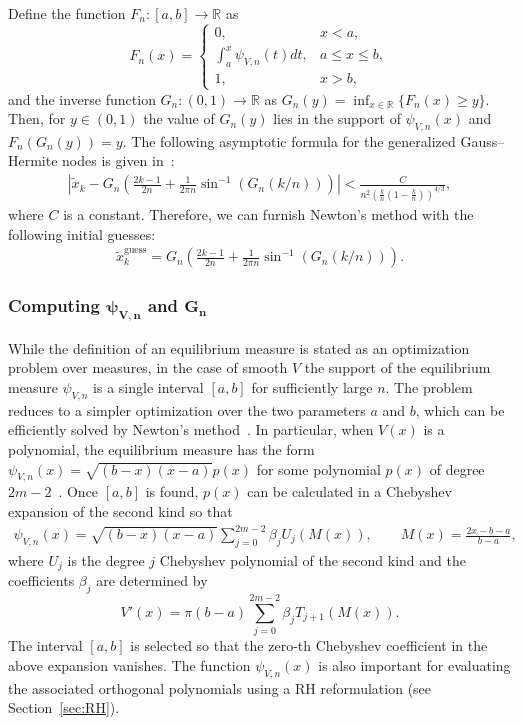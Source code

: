 \documentclass[final]{siamltex}
\begin{document}
Define the function $F_n:[a,b]\rightarrow \mathbb{R}$ as 
\[
F_n(x) = \begin{cases} 0, &  x<a,\\
\int_{a}^x \psi_{V,n}(t) dt, & a\leq x \leq b,\\
1, & x > b,\end{cases}
\]
and the inverse function $G_n:(0,1)\rightarrow \mathbb{R}$ as $G_n(y) =  \inf_{x \in \mathbb R}\{F_n(x) \geq y\} $. Then, for $y \in (0,1)$ the value of $G_n(y)$ lies in the support of $\psi_{V,n}(x)$ and $F_n(G_n(y)) = y$.  The following asymptotic formula for the generalized Gauss--Hermite nodes is given in~\cite{DKMVZ}:
\begin{align*}
\left|\tilde x_{k} - G_n\left( \frac{2k-1}{2n} + \frac{1}{2 \pi n}\sin^{-1}\left(G_n(k/n)\right) \right) \right| < \frac{C}{n^2\left(\frac{k}{n}(1-\frac{k}{n})\right)^{4/3}},
\end{align*}
where $C$ is a constant.  Therefore, we can furnish Newton's method with the following initial guesses: 
\begin{align*}
\tilde x_k^{\mathrm{guess}} = G_n\left( \frac{2k-1}{2n} + \frac{1}{2 \pi n}\sin^{-1}\left(G_n(k/n)\right)\right).
\end{align*}

\subsubsection{Computing $\bm{\psi}_{\mathbf{V,n}}$ and $\bm{G_n}$}

While the definition of an equilibrium measure is stated as an optimization problem over measures,  in the case of smooth $V$ the support of 
the equilibrium measure $\psi_{V,n}$ is a single interval $[a,b]$ for sufficiently large $n$. The problem reduces 
to a simpler optimization over the two parameters $a$ and $b$, which can be efficiently solved by Newton's method~\cite{OlverEM}.  
In particular, when $V(x)$ is a polynomial, the equilibrium measure has the form $\psi_{V,n}(x) = \sqrt{(b-x)(x-a)}p(x)$ for some 
polynomial $p(x)$ of degree $2m-2$~\cite[p.~175]{Deift_Book}.  Once $[a,b]$ is found,  $p(x)$ can be calculated in a Chebyshev expansion of the second kind so that
\begin{align*}
\psi_{V,n}(x) = \sqrt{(b-x)(x-a)} \sum_{j=0}^{2m-2} \beta_j U_j\left(M(x)\right), \qquad M(x) = \frac{2x - b-a}{b-a},
\end{align*} 
where $U_j$ is the degree $j$ Chebyshev polynomial of the second kind and the coefficients $\beta_j$ are determined by
	$$V'(x) =  \pi (b-a) \sum_{j=0}^{2m-2} \beta_j T_{j+1}\left(M(x)\right).$$
The interval $[a,b]$ is selected so that the zero-th Chebyshev coefficient in the above expansion vanishes.
The function 
$\psi_{V,n}(x)$ is also important for evaluating the associated orthogonal polynomials using a 
RH reformulation (see Section~\ref{sec:RH}).
\end{document}
